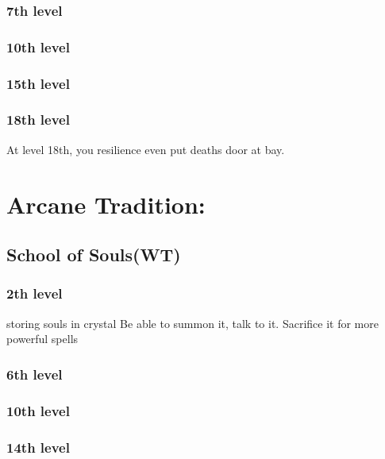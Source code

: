 \subsubsection{7th level}

\subsubsection{10th level}

\subsubsection{15th level}

\subsubsection{18th level}
At level 18th, you resilience even put deaths door at bay.

\section{Arcane Tradition:}
\subsection{School of Souls(WT)}

\subsubsection{2th level}
storing souls in crystal
	Be able to summon it, talk to it.
	Sacrifice it for more powerful spells
	

\subsubsection{6th level}

\subsubsection{10th level}

\subsubsection{14th level}